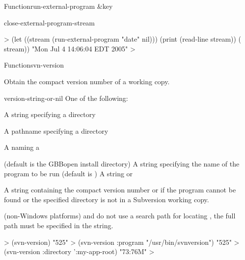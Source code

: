 \documentclass[10pt,twoside,english,pdftex]{article}
\begin{document}
\begin{functiondoc}{Function}{run-external-program}{
  \&key 
  }
\begin{alsos}{close-external-program-stream}
\end{alsos}

%
\fnexample
%
\W\supp
\begin{example}
  > (let ((stream (run-external-program "date" nil)))
       (print (read-line stream))
       ( stream))
  "Mon Jul  4 14:06:04 EDT 2005" 
  >
\end{example}

\end{functiondoc}


\begin{functiondoc}{Function}{svn-version}{%
     
    \returns{} }
%

\fnsyntax

\fnpurpose Obtain the 
compact version number of a working copy.

\fnpackage {}

\fnmodule {}

\fnargs
\begin{args}{version-string-or-nil}
\arg[directory] One of the following:
\begin{tightitemize}
\item A string specifying a directory
\item A pathname specifying a directory
\item A  naming a 
\end{tightitemize}
(default is the GBBopen install directory)
\arg[program] A string specifying the name of the program to be run (default
is )
 A string or \nil{}
\end{args}

\fnreturns A string containing the compact version number or \nil{} if the
program  cannot be found or the specified directory is
not in a Subversion working copy.
  
\fndescription
%
 (non-Windows platforms) and
 do not use a search path for
locating , the full path must be specified in the 
string.


\fnexamples
%
\W\supp
\begin{example}
  > (svn-version)
  "525" 
  > (svn-version :program "/usr/bin/svnversion")
  "525" 
  > (svn-version :directory ':my-app-root)
  "73:76M" 
  >
\end{example}

\end{functiondoc}
\end{document}
